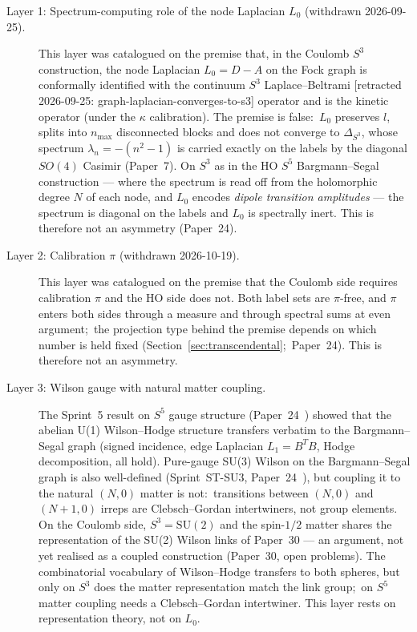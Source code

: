 \documentclass[twocolumn,pra,amsmath,amssymb,superscriptaddress]{revtex4-2}
\begin{document}
\begin{description}
\item[Layer 1: Spectrum-computing role of the node Laplacian $L_0$ (withdrawn 2026-09-25).]
  This layer was catalogued on the premise that, in the Coulomb $S^3$
  construction, the node Laplacian $L_0 = D - A$ on the Fock graph is
  conformally identified with the continuum $S^3$ Laplace--Beltrami [retracted 2026-09-25: graph-laplacian-converges-to-s3]
  operator and is the kinetic operator (under the $\kappa$
  calibration).  The premise is false:\ $L_0$ preserves $l$, splits
  into $n_{\max}$ disconnected blocks and does not converge to
  $\Delta_{S^3}$, whose spectrum $\lambda_n = -(n^2 - 1)$ is carried
  exactly on the labels by the diagonal $SO(4)$ Casimir (Paper~7).  On
  $S^3$ as in the HO $S^5$ Bargmann--Segal construction --- where the
  spectrum is read off from the holomorphic degree $N$ of each node,
  and $L_0$ encodes \emph{dipole transition amplitudes} --- the
  spectrum is diagonal on the labels and $L_0$ is spectrally inert.
  This is therefore not an asymmetry (Paper~24).
\item[Layer 2: Calibration $\pi$ (withdrawn 2026-10-19).]  This layer
  was catalogued on the premise that the Coulomb side requires
  calibration $\pi$ and the HO side does not.  Both label sets are
  $\pi$-free, and $\pi$ enters both sides through a measure and through
  spectral sums at even argument;\ the projection type behind the
  premise depends on which number is held fixed
  (Section~\ref{sec:transcendental};\ Paper~24).  This is therefore not
  an asymmetry.
\item[Layer 3: Wilson gauge with natural matter coupling.]  The
  Sprint~5 result on $S^5$ gauge structure (Paper~24~\cite{paper24}) showed
  that the abelian U(1) Wilson--Hodge structure transfers verbatim
  to the Bargmann--Segal graph (signed incidence, edge Laplacian
  $L_1 = B^T B$, Hodge decomposition, all hold).  Pure-gauge SU(3)
  Wilson on the Bargmann--Segal graph is also well-defined
  (Sprint~ST-SU3, Paper~24~\cite{paper24}), but coupling it to the
  natural $(N,0)$ matter is not:\ transitions between $(N, 0)$ and
  $(N+1, 0)$ irreps are Clebsch--Gordan intertwiners, not group
  elements.  On the Coulomb side, $S^3 = \mathrm{SU}(2)$ and the
  spin-$1/2$ matter shares the representation of the SU(2) Wilson
  links of Paper~30 --- an argument, not yet realised as a coupled
  construction (Paper~30, open problems).  The combinatorial
  vocabulary of Wilson--Hodge transfers to both spheres, but only on
  $S^3$ does the matter representation match the link group;\ on
  $S^5$ matter coupling needs a Clebsch--Gordan intertwiner.  This
  layer rests on representation theory, not on $L_0$.
\end{description}
\end{document}
